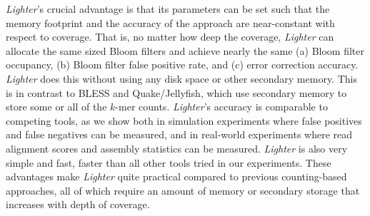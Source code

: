 \documentclass[10pt]{article}
\begin{document}
\emph{Lighter}'s crucial advantage is that its parameters can be set such that the memory footprint and the accuracy of the approach are near-constant with respect to coverage.
That is, no matter how deep the coverage, \emph{Lighter} can allocate the same sized Bloom filters and achieve nearly the same (a) Bloom filter occupancy, (b) Bloom filter false positive rate, and (c) error correction accuracy.
\emph{Lighter} does this without using any disk space or other secondary memory.
This is in contrast to BLESS and Quake/Jellyfish, which use secondary memory to store some or all of the $k$-mer counts.
\emph{Lighter}'s accuracy is comparable to competing tools, as we show both in simulation experiments where false positives and false negatives can be measured, and in real-world experiments where read alignment scores and assembly statistics can be measured.  
\emph{Lighter} is also very simple and fast, faster than all other tools tried in our experiments.
These advantages make \emph{Lighter} quite practical compared to previous counting-based approaches, all of which require an amount of memory or secondary storage that increases with depth of coverage.





\end{document}
